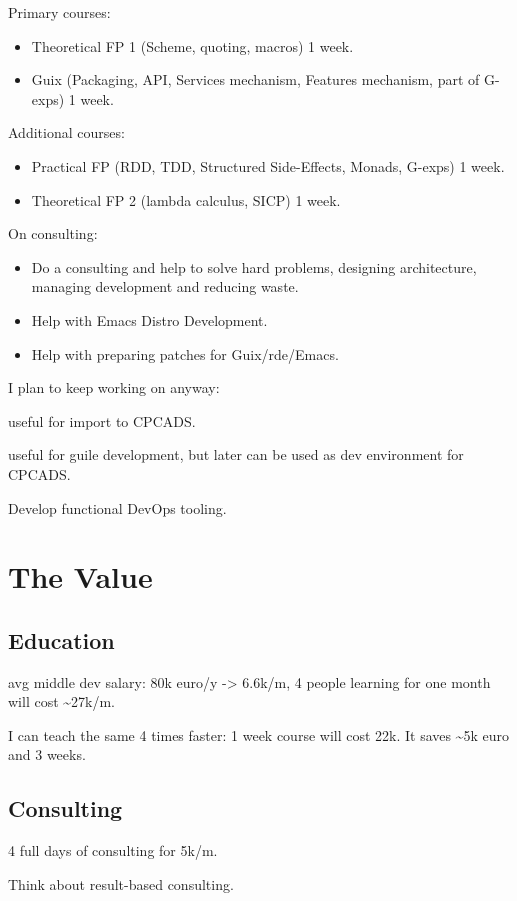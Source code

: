 \documentclass[11pt]{report}
\begin{document}
Primary courses:
\begin{itemize}
\item Theoretical FP 1 (Scheme, quoting, macros) 1 week.
\item Guix (Packaging, API, Services mechanism, Features mechanism, part of G-exps)
1 week.
\end{itemize}

Additional courses:
\begin{itemize}
\item Practical FP (RDD, TDD, Structured Side-Effects, Monads, G-exps) 1 week.
\item Theoretical FP 2 (lambda calculus, SICP) 1 week.
\end{itemize}

On consulting:
\begin{itemize}
\item Do a consulting and help to solve hard problems, designing architecture,
managing development and reducing waste.
\item Help with Emacs Distro Development.
\item Help with preparing patches for Guix/rde/Emacs.
\end{itemize}

I plan to keep working on anyway:
\begin{description}
\item[{Develop guile-tree-sitter}] useful for import to CPCADS.
\item[{Develop gider, a scheme dev environment}] useful for guile development, but
later can be used as dev environment for CPCADS.
\item Develop functional DevOps tooling.
\end{description}

\part{The Value}
\label{sec:org854bb83}
\chapter{Education}
\label{sec:orgbb28f65}
avg middle dev salary: 80k euro/y -> 6.6k/m,
4 people learning for one month will cost \textasciitilde{}27k/m.

I can teach the same 4 times faster:
1 week course will cost 22k. It saves \textasciitilde{}5k euro and 3 weeks.

\chapter{Consulting}
\label{sec:orgf613bb6}
4 full days of consulting for 5k/m.

Think about result-based consulting.
\end{document}
